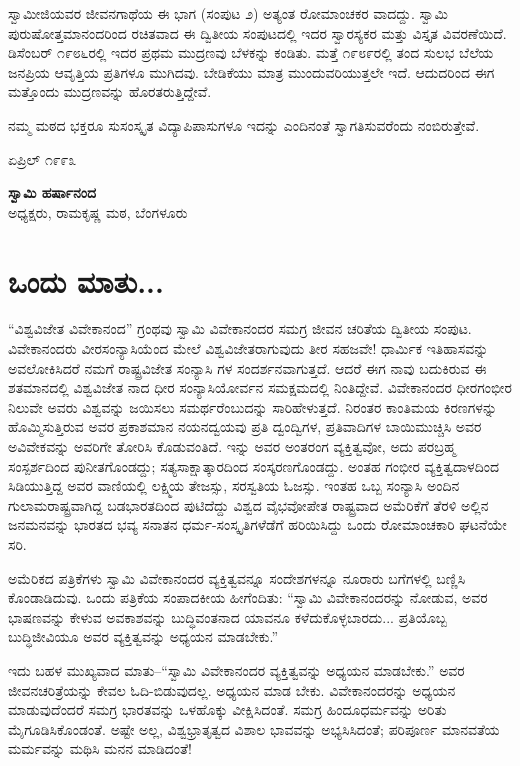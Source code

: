 ಸ್ವಾಮೀಜಿಯವರ ಜೀವನಗಾಥೆಯ ಈ ಭಾಗ (ಸಂಪುಟ ೨) ಅತ್ಯಂತ ರೋಮಾಂಚಕರ ವಾದದ್ದು. ಸ್ವಾಮಿ ಪುರುಷೋತ್ತಮಾನಂದರಿಂದ ರಚಿತವಾದ ಈ ದ್ವಿತೀಯ ಸಂಪುಟದಲ್ಲಿ ಇದರ ಸ್ವಾರಸ್ಯಕರ ಮತ್ತು ವಿಸ್ತೃತ ವಿವರಣೆಯಿದೆ. ಡಿಸೆಂಬರ್ ೧೯೮೬ರಲ್ಲಿ ಇದರ ಪ್ರಥಮ ಮುದ್ರಣವು ಬೆಳಕನ್ನು ಕಂಡಿತು. ಮತ್ತೆ ೧೯೮೯ರಲ್ಲಿ ತಂದ ಸುಲಭ ಬೆಲೆಯ ಜನಪ್ರಿಯ ಆವೃತ್ತಿಯ ಪ್ರತಿಗಳೂ ಮುಗಿದವು. ಬೇಡಿಕೆಯು ಮಾತ್ರ ಮುಂದುವರಿಯುತ್ತಲೇ ಇದೆ. ಆದುದರಿಂದ ಈಗ ಮತ್ತೊಂದು ಮುದ್ರಣವನ್ನು ಹೊರತರುತ್ತಿದ್ದೇವೆ.

ನಮ್ಮ ಮಠದ ಭಕ್ತರೂ ಸುಸಂಸ್ಕೃತ ವಿದ್ಯಾಪಿಪಾಸುಗಳೂ ಇದನ್ನು ಎಂದಿನಂತೆ ಸ್ವಾಗತಿಸುವರೆಂದು ನಂಬಿರುತ್ತೇವೆ.

ಏಪ್ರಿಲ್ ೧೯೯೩

\begin{flushright}
\textbf{ಸ್ವಾಮಿ ಹರ್ಷಾನಂದ}\\ಅಧ್ಯಕ್ಷರು, ರಾಮಕೃಷ್ಣ ಮಠ, ಬೆಂಗಳೂರು
\end{flushright}

\chapter{ಒಂದು ಮಾತು...}

\noindent

“ವಿಶ್ವವಿಜೇತ ವಿವೇಕಾನಂದ” ಗ್ರಂಥವು ಸ್ವಾಮಿ ವಿವೇಕಾನಂದರ ಸಮಗ್ರ ಜೀವನ ಚರಿತೆಯ ದ್ವಿತೀಯ ಸಂಪುಟ. ವಿವೇಕಾನಂದರು ವೀರಸಂನ್ಯಾಸಿಯೆಂದ ಮೇಲೆ ವಿಶ್ವವಿಜೇತರಾಗುವುದು ತೀರ ಸಹಜವೇ! ಧಾರ್ಮಿಕ ಇತಿಹಾಸವನ್ನು ಅವಲೋಕಿಸಿದರೆ ನಮಗೆ ರಾಷ್ಟ್ರವಿಜೇತ ಸಂನ್ಯಾಸಿ ಗಳ ಸಂದರ್ಶನವಾಗುತ್ತದೆ. ಆದರೆ ಈಗ ನಾವು ಬದುಕಿರುವ ಈ ಶತಮಾನದಲ್ಲಿ ವಿಶ್ವವಿಜೇತ ನಾದ ಧೀರ ಸಂನ್ಯಾಸಿಯೋರ್ವನ ಸಮಕ್ಷಮದಲ್ಲಿ ನಿಂತಿದ್ದೇವೆ. ವಿವೇಕಾನಂದರ ಧೀರಗಂಭೀರ ನಿಲುವೇ ಅವರು ವಿಶ್ವವನ್ನು ಜಯಿಸಲು ಸಮರ್ಥರೆಂಬುದನ್ನು ಸಾರಿಹೇಳುತ್ತದೆ. ನಿರಂತರ ಕಾಂತಿಮಯ ಕಿರಣಗಳನ್ನು ಹೊಮ್ಮಿಸುತ್ತಿರುವ ಅವರ ಪ್ರಕಾಶಮಾನ ನಯನದ್ವಯವು ಪ್ರತಿ ದ್ವಂದ್ವಿಗಳ, ಪ್ರತಿವಾದಿಗಳ ಬಾಯಿಮುಚ್ಚಿಸಿ ಅವರ ಅವಿವೇಕವನ್ನು ಅವರಿಗೇ ತೋರಿಸಿ ಕೊಡುವಂತಿದೆ. ಇನ್ನು ಅವರ ಅಂತರಂಗ ವ್ಯಕ್ತಿತ್ವವೋ, ಅದು ಪರಬ್ರಹ್ಮ ಸಂಸ್ಪರ್ಶದಿಂದ ಪುನೀತಗೊಂಡದ್ದು; ಸತ್ಯಸಾಕ್ಷಾತ್ಕಾರದಿಂದ ಸಂಸ್ಕರಣಗೊಂಡದ್ದು. ಅಂತಹ ಗಂಭೀರ ವ್ಯಕ್ತಿತ್ವದಾಳದಿಂದ ಸಿಡಿಯುತ್ತಿದ್ದ ಅವರ ವಾಣಿಯಲ್ಲಿ ಲಕ್ಷ್ಮಿಯ ತೇಜಸ್ಸು, ಸರಸ್ವತಿಯ ಓಜಸ್ಸು. ಇಂತಹ ಒಬ್ಬ ಸಂನ್ಯಾಸಿ ಅಂದಿನ ಗುಲಾಮರಾಷ್ಟ್ರವಾಗಿದ್ದ ಬಡಭಾರತದಿಂದ ಪುಟಿದೆದ್ದು ವಿಶ್ವದ ವೈಭವೋಪೇತ ರಾಷ್ಟ್ರವಾದ ಅಮೆರಿಕೆಗೆ ತೆರಳಿ ಅಲ್ಲಿನ ಜನಮನವನ್ನು ಭಾರತದ ಭವ್ಯ ಸನಾತನ ಧರ್ಮ-ಸಂಸ್ಕೃತಿಗಳೆಡೆಗೆ ಹರಿಯಿಸಿದ್ದು ಒಂದು ರೋಮಾಂಚಕಾರಿ ಘಟನೆಯೇ ಸರಿ.

ಅಮೆರಿಕದ ಪತ್ರಿಕೆಗಳು ಸ್ವಾಮಿ ವಿವೇಕಾನಂದರ ವ್ಯಕ್ತಿತ್ವವನ್ನೂ ಸಂದೇಶಗಳನ್ನೂ ನೂರಾರು ಬಗೆಗಳಲ್ಲಿ ಬಣ್ಣಿಸಿ ಕೊಂಡಾಡಿದುವು. ಒಂದು ಪತ್ರಿಕೆಯ ಸಂಪಾದಕೀಯ ಹೀಗೆಂದಿತು: “ಸ್ವಾಮಿ ವಿವೇಕಾನಂದರನ್ನು ನೋಡುವ, ಅವರ ಭಾಷಣವನ್ನು ಕೇಳುವ ಅವಕಾಶವನ್ನು ಬುದ್ಧಿವಂತನಾದ ಯಾವನೂ ಕಳೆದುಕೊಳ್ಳಬಾರದು... ಪ್ರತಿಯೊಬ್ಬ ಬುದ್ಧಿಜೀವಿಯೂ ಅವರ ವ್ಯಕ್ತಿತ್ವವನ್ನು ಅಧ್ಯಯನ ಮಾಡಬೇಕು.”

ಇದು ಬಹಳ ಮುಖ್ಯವಾದ ಮಾತು–“ಸ್ವಾಮಿ ವಿವೇಕಾನಂದರ ವ್ಯಕ್ತಿತ್ವವನ್ನು ಅಧ್ಯಯನ ಮಾಡಬೇಕು.” ಅವರ ಜೀವನಚರಿತ್ರೆಯನ್ನು ಕೇವಲ ಓದಿ-ಬಿಡುವುದಲ್ಲ. ಅಧ್ಯಯನ ಮಾಡ ಬೇಕು. ವಿವೇಕಾನಂದರನ್ನು ಅಧ್ಯಯನ ಮಾಡುವುದೆಂದರೆ ಸಮಗ್ರ ಭಾರತವನ್ನು ಒಳಹೊಕ್ಕು ವೀಕ್ಷಿಸಿದಂತೆ. ಸಮಗ್ರ ಹಿಂದೂಧರ್ಮವನ್ನು ಅರಿತು ಮೈಗೂಡಿಸಿಕೊಂಡಂತೆ. ಅಷ್ಟೇ ಅಲ್ಲ, ವಿಶ್ವಭ್ರಾತೃತ್ವದ ವಿಶಾಲ ಭಾವವನ್ನು ಅಭ್ಯಸಿಸಿದಂತೆ; ಪರಿಪೂರ್ಣ ಮಾನವತೆಯ ಮರ್ಮವನ್ನು ಮಥಿಸಿ ಮನನ ಮಾಡಿದಂತೆ!

